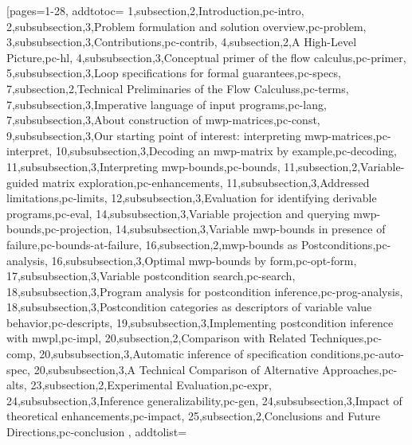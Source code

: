 [pages={1-28},
    addtotoc={
        1,subsection,2,{Introduction},pc-intro,
        2,subsubsection,3,{Problem formulation and solution overview},pc-problem,
        3,subsubsection,3,{Contributions},pc-contrib,
        4,subsection,2,{A High-Level Picture},pc-hl,
        4,subsubsection,3,{Conceptual primer of the flow calculus},pc-primer,
        5,subsubsection,3,{Loop specifications for formal guarantees},pc-specs,
        7,subsection,2,{Technical Preliminaries of the Flow Calculuss},pc-terms,
        7,subsubsection,3,{Imperative language of input programs},pc-lang,
        7,subsubsection,3,{About construction of mwp-matrices},pc-const,
        9,subsubsection,3,{Our starting point of interest: interpreting mwp-matrices},pc-interpret,
        10,subsubsection,3,{Decoding an mwp-matrix by example},pc-decoding,
        11,subsubsection,3,{Interpreting mwp-bounds},pc-bounds,
        11,subsection,2,{Variable-guided matrix exploration},pc-enhancements,
        11,subsubsection,3,{Addressed limitations},pc-limits,
        12,subsubsection,3,{Evaluation for identifying derivable programs},pc-eval,
        14,subsubsection,3,{Variable projection and querying mwp-bounds},pc-projection,
        14,subsubsection,3,{Variable mwp-bounds in presence of failure},pc-bounds-at-failure,
        16,subsection,2,{mwp-bounds as Postconditions},pc-analysis,
        16,subsubsection,3,{Optimal mwp-bounds by form},pc-opt-form,
        17,subsubsection,3,{Variable postcondition search},pc-search,
        18,subsubsection,3,{Program analysis for postcondition inference},pc-prog-analysis,
        18,subsubsection,3,{Postcondition categories as descriptors of variable value behavior},pc-descripts,
        19,subsubsection,3,{Implementing postcondition inference with mwpl},pc-impl,
        20,subsection,2,{Comparison with Related Techniques},pc-comp,
        20,subsubsection,3,{Automatic inference of specification conditions},pc-auto-spec,
        20,subsubsection,3,{A Technical Comparison of Alternative Approaches},pc-alts,
        23,subsection,2,{Experimental Evaluation},pc-expr,
        24,subsubsection,3,{Inference generalizability},pc-gen,
        24,subsubsection,3,{Impact of theoretical enhancements},pc-impact,
        25,subsection,2,{Conclusions and Future Directions},pc-conclusion
    }, addtolist={
}
